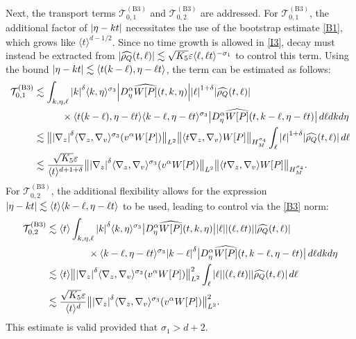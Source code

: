 \documentclass[JEP,XML,SOM,Unicode]{cedram}
\newcommand{\bnorm}[1]{\bigl\|#1\bigr\|}
\newcommand{\babs}[1]{\bigl|#1\bigr|}
\theoremstyle{plain}
\theoremstyle{remark}
\newcommand{\jb}[1]{\langle#1\rangle}
\newcommand{\ep}{\varepsilon}
\begin{document}
Next, the transport terms $\mathcal{T}_{0,1}^{\mathrm{(B3)}}$ and $\mathcal{T}_{0,2}^{\mathrm{(B3)}}$ are addressed. For $\mathcal{T}_{0,1}^{\mathrm{(B3)}}$, the additional factor of $\abs{\eta-kt}$ necessitates the use of the bootstrap estimate \eqref{B1}, which grows like $\jb{t}^{d-1/2}$. Since no time growth is allowed in \eqref{I3}, decay must instead be extracted from $\abs{\widehat{\rho_Q}(t,\ell )}\lesssim\sqrt{K_5}\ep\jb{\ell ,\ell t}^{-\sigma_1}$ to control this term. Using the bound $\abs{\eta-kt}\lesssim\jb{t(k-\ell ),\eta-\ell t}$, the term can be estimated as follows:
\begin{align*}
\mathcal{T}_{0,1}^{\mathrm{(B3)}}&\lesssim\int_{k,\eta,\ell }\abs{k}^\delta\jb{k,\eta}^{\sigma_3}\abs{D_\eta^\alpha \widehat{W[P]}(t,k,\eta)}\abs{\ell }^{1+\delta}\abs{\widehat{\rho_Q}(t,\ell )}\\
&\hspace{1cm}\times\jb{t(k-\ell ),\eta-\ell t}\jb{k-\ell ,\eta-\ell t}^{\sigma_3}\babs{D_\eta^\alpha\widehat{W[P]}(t,k-\ell ,\eta-\ell t)}\,d\ell dkd\eta\\
&\lesssim\bnorm{\abs{\nabla_z}^\delta\jb{\nabla_z,\nabla_v}^{\sigma_3}(v^\alpha W[P])}_{L^2}\bnorm{\jb{t\nabla_z,\nabla_v}W[P]}_{H^{\sigma_4}_M}\int_\ell \abs{\ell }^{1+\delta}\abs{\widehat{\rho_Q}(t,\ell )}\,d\ell \\
&\lesssim\frac{\sqrt{K_5}\ep}{\jb{t}^{d+1+\delta}}\bnorm{\abs{\nabla_z}^\delta\jb{\nabla_z,\nabla_v}^{\sigma_3}(v^\alpha W[P])}_{L^2}\bnorm{\jb{t\nabla_z,\nabla_v}W[P]}_{H^{\sigma_4}_M}.
\end{align*}
For $\mathcal{T}_{0,2}^{\mathrm{(B3)}}$, the additional flexibility allows for the expression $\abs{\eta-kt}\lesssim\jb{t}\jb{k-\ell ,\eta-\ell t}$ to be used, leading to control via the \eqref{B3} norm:
\begin{align*}
\mathcal{T}_{0,2}^{\mathrm{(B3)}}&\lesssim\jb{t}\int_{k,\eta,\ell }\abs{k}^\delta\jb{k,\eta}^{\sigma_3}\babs{D_\eta^\alpha \widehat{W[P]}(t,k,\eta)}\abs{\ell }\abs{(\ell ,\ell t)}\abs{\widehat{\rho_Q}(t,\ell )}\\
&\hspace{1.5cm}\times\jb{k-\ell ,\eta-\ell t}^{\sigma_3}\abs{k-\ell }^{\delta}\babs{D_\eta^\alpha\widehat{W[P]}(t,k-\ell ,\eta-\ell t)}\,d\ell dkd\eta\\
&\lesssim\jb{t}\bnorm{\abs{\nabla_z}^\delta\jb{\nabla_z,\nabla_v}^{\sigma_3}(v^\alpha W[P])}_{L^2}^2\int_\ell \abs{\ell }\abs{(\ell ,\ell t)}\abs{\widehat{\rho_Q}(t,\ell )}\,d\ell \\
&\lesssim\frac{\sqrt{K_5}\ep}{\jb{t}^d}\bnorm{\abs{\nabla_z}^\delta\jb{\nabla_z,\nabla_v}^{\sigma_3}(v^\alpha W[P])}_{L^2}^2.
\end{align*}
This estimate is valid provided that $\sigma_1>d+2$.
\end{document}
